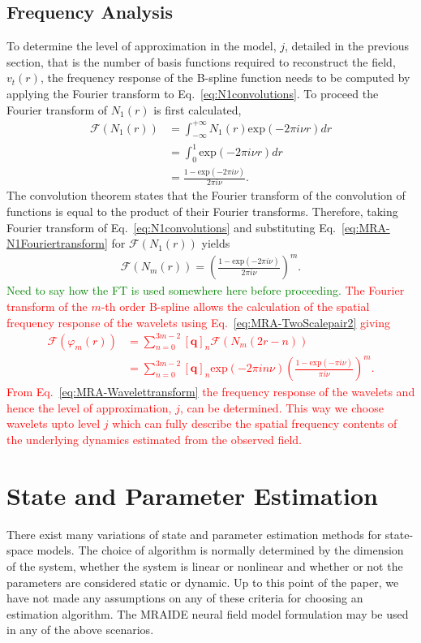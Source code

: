 \documentclass[review,authoryear,3p]{elsarticle}
\newcommand{\dean}[1]{\textcolor{green}{#1}}
\newcommand{\parham}[1]{\textcolor{red}{#1}}
\begin{document}
\subsection{Frequency Analysis}
To determine the level of approximation in the model, $j$, detailed in the previous section, that is the number of basis functions required to reconstruct the field, $v_t(r)$, the frequency response of the B-spline function needs to be computed by applying the Fourier transform to Eq.~\eqref{eq:N1convolutions}. To proceed the Fourier transform of $N_1(r)$ is first calculated, 
\begin{align}\label{eq:MRA-N1Fouriertransform}
\mathcal F(N_1(r))&=\int_{-\infty}^{+\infty}N_1(r)\mathrm{exp}(-2\pi i \nu r)dr \nonumber \\
&=\int_{0}^{1} \mathrm{exp}(-2\pi i \nu r)dr \nonumber \\
&=\frac{1-\mathrm{exp}(-2\pi i \nu)}{2\pi i\nu}.
\end{align}
The convolution theorem states that the Fourier transform of the convolution of functions is equal to the product of their Fourier transforms. Therefore, taking Fourier transform of Eq.~\eqref{eq:N1convolutions} and substituting Eq.~\eqref{eq:MRA-N1Fouriertransform} for $\mathcal F(N_1(r)) $ yields
\begin{align}\label{eq:MRA-NmFouriertransform}
\mathcal F(N_m(r))=\left(\frac{1-\mathrm{exp}(-2\pi i \nu)}{2\pi i\nu}\right)^m.
\end{align}
\dean{Need to say how the FT is used somewhere here before proceeding.} \parham{The Fourier transform of the $m$-th order B-spline allows the calculation of the spatial frequency response of the wavelets using Eq.~\eqref{eq:MRA-TwoScalepair2} giving
\begin{align}      
	  \mathcal{F}(\varphi_{m}\left(r\right)) &= \sum_{n=0}^{3m-2} \left[\mathbf q\right]_n \mathcal{F}\left(N_{m}\left(2r-n\right)\right) \nonumber\\
	&=\sum_{n=0}^{3m-2} \left[\mathbf q\right]_n \mathrm{exp}(-2\pi in\nu)\left(\frac{1-\mathrm{exp}(-\pi i \nu)}{\pi i\nu}\right)^m.\label{eq:MRA-Wavelettransform}
\end{align}
 From Eq.~\eqref{eq:MRA-Wavelettransform} the frequency response of the wavelets and hence the level of approximation, $j$, can be determined. This way we choose wavelets upto level $j$ which can fully describe the spatial frequency contents of the underlying dynamics estimated from the observed field.}
\section{State and Parameter Estimation}
There exist many variations of state and parameter estimation methods for state-space models. The choice of algorithm is normally determined by the dimension of the system, whether the system is linear or nonlinear and whether or not the parameters are considered static or dynamic. Up to this point of the paper, we have not made any assumptions on any of these criteria for choosing an estimation algorithm. The MRAIDE neural field model formulation may be used in any of the above scenarios. 
\end{document}
